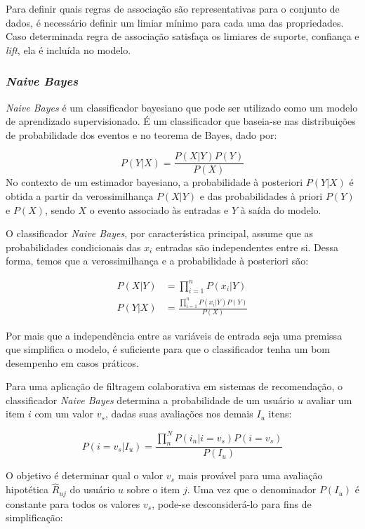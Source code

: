 Para definir quais regras de associação são representativas para o conjunto de
dados, é necessário definir um limiar mínimo para cada uma das propriedades.
Caso determinada regra de associação satisfaça os limiares de suporte,
confiança e \textit{lift}, ela é incluída no modelo.

\subsubsection{\textit{Naive Bayes}}

\textit{Naive Bayes} é um classificador bayesiano que pode ser utilizado como um
modelo de aprendizado supervisionado. É um classificador que baseia-se nas distribuições de
probabilidade dos eventos e no teorema de Bayes, dado por:

\begin{equation}
    P(Y|X) = \frac{P(X|Y)P(Y)}{P(X)}
    \end{equation}
No contexto de um estimador bayesiano, a probabilidade à posteriori $P(Y|X)$ é
obtida a partir da verossimilhança $P(X|Y)$ e das probabilidades à priori $P(Y)$
e $P(X)$, sendo $X$ o evento associado às entradas e $Y$ à saída do modelo.

O classificador \textit{Naive Bayes}, por característica principal, assume que
as probabilidades condicionais das $x_i$ entradas são independentes entre si.
Dessa forma, temos que a verossimilhança e a probabilidade à posteriori são:

\begin{align}
    P(X|Y) &= \prod_{i=1}^{n}P(x_i|Y) \\
    P(Y|X) &= \frac{\prod_{i=1}^{n}P(x_i|Y)P(Y)}{P(X)}
\end{align}

Por mais que a independência entre as variáveis de entrada seja uma premissa
que simplifica o modelo, é suficiente para que o classificador tenha um bom
desempenho em casos práticos.

Para uma aplicação de filtragem colaborativa em sistemas de recomendação, o
classificador \textit{Naive Bayes} determina a probabilidade de um usuário $u$
avaliar um item $i$ com um valor $v_s$, dadas suas avaliações nos demais $I_u$
itens:

\begin{equation}
    P(i = v_s|I_u) = \frac{\prod_{n}^{N}P(i_{n}|i = v_s)P(i = v_s)}{P(I_u)}
\end{equation}

O objetivo é determinar qual o valor $v_s$ mais provável para uma avaliação
hipotética $\hat{R}_{uj}$ do usuário $u$ sobre o item $j$. Uma vez que o denominador $P(I_u)$
é constante para todos os valores $v_s$, pode-se desconsiderá-lo para fins de
simplificação:

